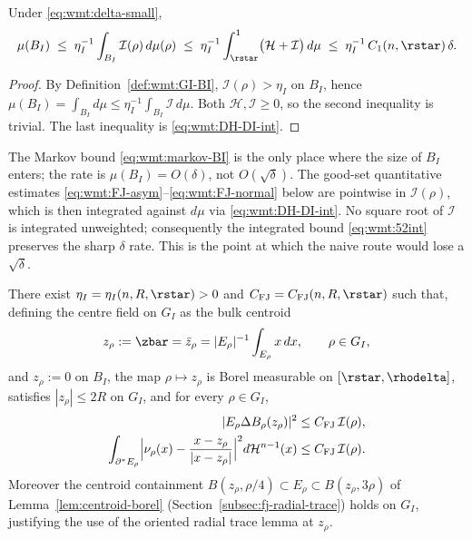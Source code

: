 \begin{lemma}\label{lem:wmt:markov-BI}
Under \eqref{eq:wmt:delta-small},
\begin{equation}\label{eq:wmt:markov-BI}
   \mu(B_I)
   \;\le\; \eta_I^{-1}\int_{B_I}\mathcal I(\rho)\,d\mu(\rho)
   \;\le\; \eta_I^{-1}\int_{\rstar}^{1}
              \bigl(\mathcal H+\mathcal I\bigr)\,d\mu
   \;\le\; \eta_I^{-1}\,C_1(n,\rstar)\,\delta.
\end{equation}
\end{lemma}

\begin{proof}
By Definition~\ref{def:wmt:GI-BI}, $\mathcal I(\rho)>\eta_I$ on $B_I$,
hence
$\mu(B_I)=\int_{B_I}d\mu \le \eta_I^{-1}\int_{B_I}\mathcal I\,d\mu$.
Both $\mathcal H,\mathcal I\ge 0$, so the second inequality is trivial.
The last inequality is \eqref{eq:wmt:DH-DI-int}.
\end{proof}

\begin{remark}\label{rem:wmt:rate-good-bad}
The Markov bound \eqref{eq:wmt:markov-BI} is the only place where the
size of $B_I$ enters; the rate is $\mu(B_I)=O(\delta)$, not
$O(\sqrt{\delta})$. The good-set quantitative estimates
\eqref{eq:wmt:FJ-asym}--\eqref{eq:wmt:FJ-normal} below are pointwise in
$\mathcal I(\rho)$, which is then integrated against $d\mu$ via
\eqref{eq:wmt:DH-DI-int}. No square root of $\mathcal I$ is integrated
unweighted; consequently the integrated bound \eqref{eq:wmt:52int}
preserves the sharp $\delta$ rate. This is the point at which the
naive route would lose a $\sqrt{\delta}$.
\end{remark}

\begin{lemma}
\label{lem:fj-center-package}\label{lem:FJ-package}
There exist $\eta_I=\eta_I(n,R,\rstar)>0$ and
$C_{\mathrm{FJ}}=C_{\mathrm{FJ}}(n,R,\rstar)$ such that, defining the
centre field on $G_I$ as the bulk centroid
\begin{equation}\label{eq:wmt:zrho-is-centroid}
   z_\rho:=\zbar=\bar z_\rho=|E_\rho|^{-1}\int_{E_\rho}x\,dx,
   \qquad \rho\in G_I,
\end{equation}
and $z_\rho:=0$ on $B_I$, the map $\rho\mapsto z_\rho$ is Borel
measurable on $[\rstar,\rhodelta]$, satisfies $|z_\rho|\le 2R$ on
$G_I$, and for every $\rho\in G_I$,
\begin{align}
   |E_\rho\Delta B_\rho(z_\rho)|^2
      &\le C_{\mathrm{FJ}}\,\mathcal I(\rho),\label{eq:wmt:FJ-asym}\\
   \int_{\partial^*E_\rho}
      \Bigl|\nu_\rho(x)-\frac{x-z_\rho}{|x-z_\rho|}\Bigr|^2
      d\mathcal H^{n-1}(x)
      &\le C_{\mathrm{FJ}}\,\mathcal I(\rho).\label{eq:wmt:FJ-normal}
\end{align}
Moreover the centroid containment
\(B(z_\rho,\rho/4)\subset E_\rho\subset B(z_\rho,3\rho)\) of
Lemma~\ref{lem:centroid-borel} (Section~\ref{subsec:fj-radial-trace})
holds on $G_I$, justifying the use of the oriented radial trace lemma
at $z_\rho$.
\end{lemma}

